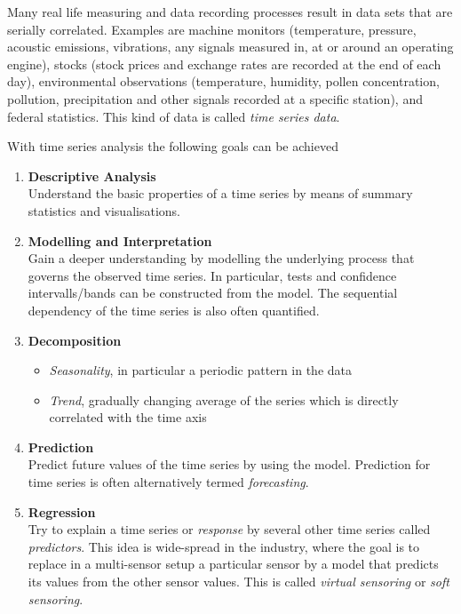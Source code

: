 \documentclass[11pt]{article}
\begin{document}
Many real life measuring and data recording processes result in data sets that are serially correlated. Examples are machine monitors (temperature, pressure, acoustic emissions, vibrations, any signals measured in, at or around an operating engine), stocks (stock prices and exchange rates are recorded at the end of each day), environmental observations (temperature, humidity, pollen concentration, pollution, precipitation and other signals recorded at a specific station), and federal statistics. This kind of data is called \emph{time series data}. 

With time series analysis the following goals can be achieved
\begin{enumerate}
	\item \textbf{Descriptive Analysis}\\
	Understand the basic properties of a time series by means of summary statistics and visualisations.
	\item \textbf{Modelling and Interpretation}\\
	Gain a deeper understanding by modelling the underlying process that governs the observed time series. In particular, tests and confidence intervalls/bands can be constructed from the model. The sequential dependency of the time series is also often quantified.
	\item \textbf{Decomposition}
	\begin{itemize}
		\item \emph{Seasonality}, in particular a periodic pattern in the data
		\item \emph{Trend}, gradually changing average of the series which is directly correlated with the time axis
	\end{itemize}
	\item \textbf{Prediction}\\
	Predict future values of the time series by using the model. Prediction for time series is often alternatively termed \emph{forecasting}.
	\item \textbf{Regression}\\
	Try to explain a time series or \emph{response} by several other time series called \emph{predictors}. This idea is wide-spread in the industry, where the goal is to replace in a multi-sensor setup a particular sensor by a model that predicts its values from the other sensor values. This is called \emph{virtual sensoring} or \emph{soft sensoring}.
\end{enumerate}
\end{document}
